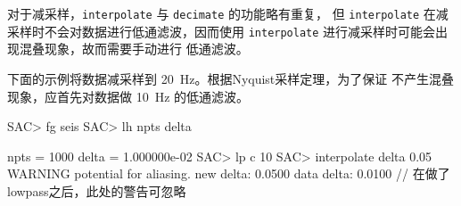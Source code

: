 对于减采样，\texttt{interpolate} 与 \texttt{decimate} 的功能略有重复，
但 \texttt{interpolate} 在减采样时不会对数据进行低通滤波，因而使用 
\texttt{interpolate} 进行减采样时可能会出现混叠现象，故而需要手动进行
低通滤波。

下面的示例将数据减采样到 \SI{20}{\Hz}。根据Nyquist采样定理，为了保证
不产生混叠现象，应首先对数据做 \SI{10}{\Hz} 的低通滤波。
\begin{SACCode}
SAC> fg seis
SAC> lh npts delta

     npts = 1000
     delta = 1.000000e-02
SAC> lp c 10
SAC> interpolate delta 0.05
WARNING potential for aliasing. new delta: 0.0500 data delta: 0.0100
    //  在做了lowpass之后，此处的警告可忽略
\end{SACCode}

